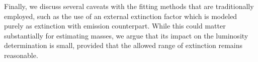 Finally, we discuss several caveats with the fitting methods that are traditionally employed, such as the use of an external extinction factor which is modeled purely as extinction with emission counterpart. While this could matter substantially for estimating masses, we argue that its impact on the luminosity determination is small, provided that the allowed range of extinction remains reasonable. 


%
%
